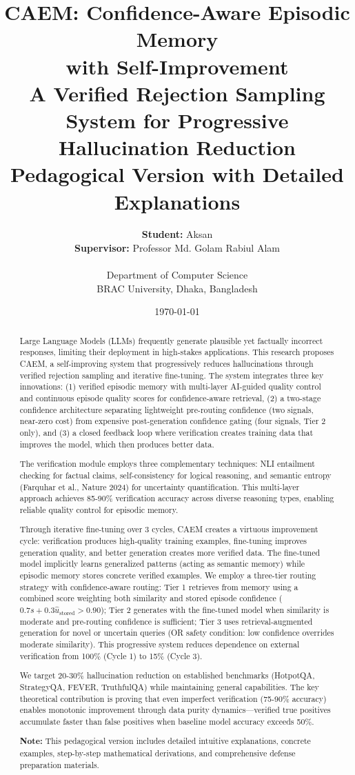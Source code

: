 \documentclass[12pt,a4paper]{article}
\title{\textbf{CAEM: Confidence-Aware Episodic Memory\\with Self-Improvement}\\
\vspace{0.5cm}
\large A Verified Rejection Sampling System for Progressive Hallucination Reduction\\
\vspace{0.3cm}
\large \textbf{Pedagogical Version with Detailed Explanations}}
\author{
\textbf{Student:} Aksan\\
\textbf{Supervisor:} Professor Md. Golam Rabiul Alam\\
\\
Department of Computer Science\\
BRAC University, Dhaka, Bangladesh
}
\date{\today}
\theoremstyle{definition}
\newcommand{\caem}{\textsc{CAEM}}
\newcommand{\ustored}{\hat{u}_{\text{stored}}}
\begin{document}
\maketitle

\begin{abstract}
Large Language Models (LLMs) frequently generate plausible yet factually incorrect responses, limiting their deployment in high-stakes applications. This research proposes \caem{}, a self-improving system that progressively reduces hallucinations through verified rejection sampling and iterative fine-tuning. The system integrates three key innovations: (1) verified episodic memory with multi-layer AI-guided quality control and continuous episode quality scores for confidence-aware retrieval, (2) a two-stage confidence architecture separating lightweight pre-routing confidence (two signals, near-zero cost) from expensive post-generation confidence gating (four signals, Tier 2 only), and (3) a closed feedback loop where verification creates training data that improves the model, which then produces better data.

The verification module employs three complementary techniques: NLI entailment checking for factual claims, self-consistency for logical reasoning, and semantic entropy (Farquhar et al., Nature 2024) for uncertainty quantification. This multi-layer approach achieves 85-90\% verification accuracy across diverse reasoning types, enabling reliable quality control for episodic memory.

Through iterative fine-tuning over 3 cycles, \caem{} creates a virtuous improvement cycle: verification produces high-quality training examples, fine-tuning improves generation quality, and better generation creates more verified data. The fine-tuned model implicitly learns generalized patterns (acting as semantic memory) while episodic memory stores concrete verified examples. We employ a three-tier routing strategy with confidence-aware routing: Tier 1 retrieves from memory using a combined score weighting both similarity and stored episode confidence ($0.7s + 0.3\ustored > 0.90$); Tier 2 generates with the fine-tuned model when similarity is moderate and pre-routing confidence is sufficient; Tier 3 uses retrieval-augmented generation for novel or uncertain queries (OR safety condition: low confidence overrides moderate similarity). This progressive system reduces dependence on external verification from 100\% (Cycle 1) to 15\% (Cycle 3).

We target 20-30\% hallucination reduction on established benchmarks (HotpotQA, StrategyQA, FEVER, TruthfulQA) while maintaining general capabilities. The key theoretical contribution is proving that even imperfect verification (75-90\% accuracy) enables monotonic improvement through data purity dynamics—verified true positives accumulate faster than false positives when baseline model accuracy exceeds 50\%.

\textbf{Note:} This pedagogical version includes detailed intuitive explanations, concrete examples, step-by-step mathematical derivations, and comprehensive defense preparation materials.
\end{abstract}
\end{document}
